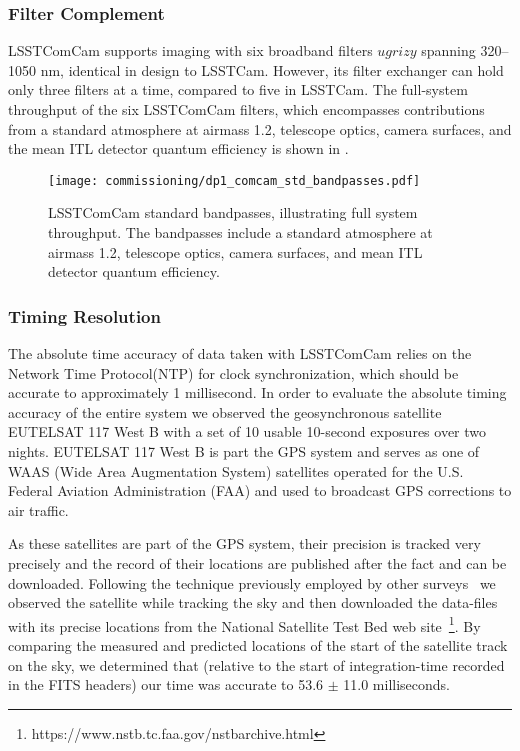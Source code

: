 \subsubsection{Filter Complement}
\label{sssec:comcam_filters}
\gls{LSSTComCam} supports imaging with six broadband filters $ugrizy$ spanning 320–1050 nm, identical in design to \gls{LSSTCam}.
However, its filter exchanger can hold only three filters at a time, compared to five in \gls{LSSTCam}.
The full-system throughput of the six \gls{LSSTComCam} filters, which encompasses contributions from a standard atmosphere at airmass 1.2, telescope optics, camera surfaces, and the mean \gls{ITL} detector quantum efficiency is shown in .
\begin{figure}[htb!]
\centering
\texttt{[image: commissioning/dp1\_comcam\_std\_bandpasses.pdf]}
\caption{LSSTComCam standard bandpasses, illustrating full system throughput. The bandpasses include a standard atmosphere at airmass 1.2, telescope optics, camera surfaces, and mean \gls{ITL} detector quantum efficiency.}
\label{fig:comcam_standard_bandpasses}
\vspace{0.1cm}
\end{figure}

\subsubsection{Timing Resolution}
\label{ssec:comcam_timing}

The absolute time accuracy of data taken with LSSTComCam relies on the Network Time Protocol(NTP) for clock synchronization, which should be accurate to approximately 1 millisecond. In order to evaluate the absolute timing accuracy of the entire system we observed the geosynchronous satellite EUTELSAT 117 West B with a set of 10 usable 10-second exposures over two nights.  EUTELSAT 117 West B is part the GPS system and serves as one of WAAS (Wide Area Augmentation System) satellites operated for the U.S. Federal Aviation Administration (FAA) and used to broadcast GPS corrections to air traffic.

As these satellites are part of the GPS system, their precision is tracked very precisely and the record of their locations are published after the fact and can be downloaded.  Following the technique previously employed by other surveys~\citep{2018PASP..130f4505T} we observed the satellite while tracking the sky and then downloaded the data-files with its precise locations from the National Satellite Test Bed web site~\footnote{https://www.nstb.tc.faa.gov/nstbarchive.html}.  By comparing the measured and predicted locations of the start of the satellite track on the sky, we determined that (relative to the start of integration-time recorded in the FITS headers) our time was accurate to 53.6 $\pm$ 11.0 milliseconds.


